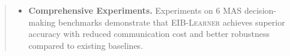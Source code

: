 \documentclass[11pt]{article}
\newcommand{\ourmethod}{\textsc{{EIB-Learner}}\xspace}
\begin{document}
\begin{abstract}
\begin{itemize}[leftmargin=10pt]
    \item \textbf{Comprehensive Experiments.} Experiments on 6 MAS decision-making benchmarks demonstrate that \ourmethod achieves superior accuracy with reduced communication cost and better robustness compared to existing baselines.
\end{itemize}



\end{abstract}
\end{document}
